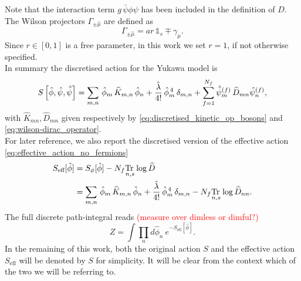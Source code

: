 Note that the interaction term $g\, \bar\psi\phi\psi$ has been included in the definition of $D$. \\
The Wilson projectors $\Gamma_{\pm \hat \mu}$ are defined as
\begin{equation*}
    \Gamma_{\pm \hat \mu} = ar \, \mathds{1}_s \mp \gamma_\mu.
\end{equation*}
Since $r \in [0,1]$ is a free parameter, in this work we set $r=1$, if not otherwise specified. \\
In summary the discretised action for the Yukawa model is 
\begin{equation*}
    S\left[\hat{\phi}, \hat{\psi}, \hat{\bar{\psi}} \right] = \sum_{m,n} \, \hat{\phi}_m \, \widehat{K}_{m,n} \, \hat{\phi}_n + \frac{\hat{\lambda}}{4!} \, \hat{\phi}_m^{\,4} \, \delta_{m,n} + \sum_{f=1}^{N_f}\hat{\bar{\psi}}_m^{(f)} \, \widehat{D}_{mn} \hat{\psi}_n^{(f)},
\end{equation*}
with $\widehat{K}_{mn}, \widehat{D}_{mn}$ given respectively by \eqref{eq:discretised_kinetic_op_bosons} and \eqref{eq:wilson-dirac_operator}. \\
For later reference, we also report the discretised version of the effective action \eqref{eq:effective_action_no_fermions}
\begin{equation}
	\begin{aligned}
		S_\text{eff}[\hat\phi] 	&= S_\phi[\hat\phi] - N_f \underset{n,s}{\operatorname{\text{Tr} \,}} \log \widehat{D} \\
							&= \sum_{m,n} \, \hat{\phi}_m \, \widehat{K}_{m,n} \, \hat{\phi}_n + \frac{\hat{\lambda}}{4!} \, \hat{\phi}_m^{\,4} \, \delta_{m,n} - N_f \underset{n,s}{\operatorname{\text{Tr} \,}} \log \widehat{D}_{nn}.
	\end{aligned}
	\label{eq:discretised_effective_action}
\end{equation}
The full discrete path-integral reads \textcolor{red}{(measure over dimless or dimful?)}
\begin{equation}
    Z = \int \prod_n d\hat\phi_n \ e^{-S_\text{eff}[\hat\phi]}.
    \label{eq:discretised_path_integral}
\end{equation}
In the remaining of this work, both the original action $S$ and the effective action $S_\text{eff}$ will be denoted by $S$ for simplicity. It will be clear from the context which of the two we will be referring to.

